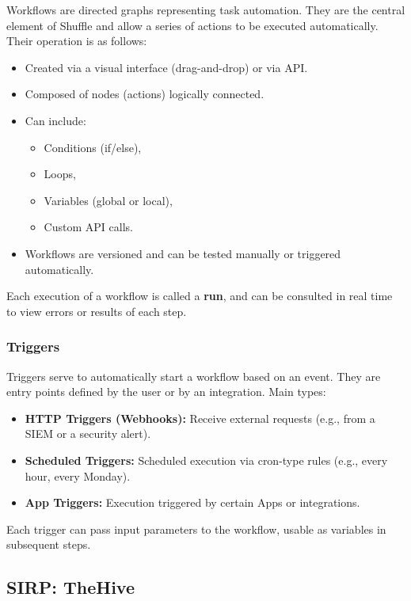 Workflows are directed graphs representing task automation. They are the central element of Shuffle and allow a series of actions to be executed automatically. Their operation is as follows:

\begin{itemize}
    \item Created via a visual interface (drag-and-drop) or via API.
    \item Composed of nodes (actions) logically connected.
    \item Can include:
    \begin{itemize}
        \item Conditions (if/else),
        \item Loops,
        \item Variables (global or local),
        \item Custom API calls.
    \end{itemize}
    \item Workflows are versioned and can be tested manually or triggered automatically.
\end{itemize}

Each execution of a workflow is called a \textbf{run}, and can be consulted in real time to view errors or results of each step.

\subsubsection{Triggers}

Triggers serve to automatically start a workflow based on an event. They are entry points defined by the user or by an integration. Main types:

\begin{itemize}
    \item \textbf{HTTP Triggers (Webhooks):} Receive external requests (e.g., from a SIEM or a security alert).
    \item \textbf{Scheduled Triggers:} Scheduled execution via cron-type rules (e.g., every hour, every Monday).
    \item \textbf{App Triggers:} Execution triggered by certain Apps or integrations.
\end{itemize}

Each trigger can pass input parameters to the workflow, usable as variables in subsequent steps.

\subsection{SIRP: TheHive}
\label{subsec:thehive}

